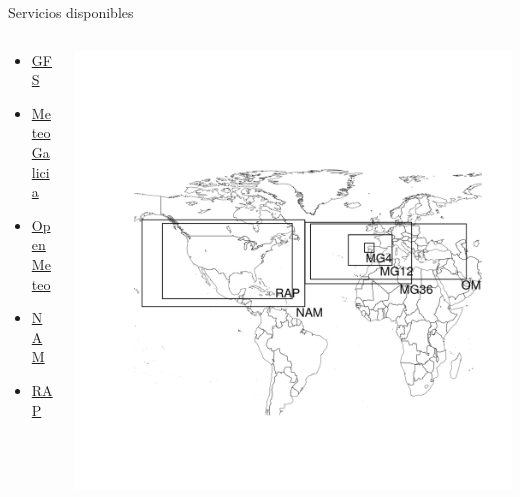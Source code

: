\documentclass[xcolor={usenames,svgnames,dvipsnames}]{beamer}
\begin{document}
\begin{frame}[label=sec-1-2]{Servicios disponibles}
\begin{columns}
\begin{column}{0.3\textwidth}

\begin{itemize}
\item \href{http://www.emc.ncep.noaa.gov/index.php?branch=GFS}{GFS}
\item \href{http://www.meteogalicia.es/web/modelos/threddsIndex.action}{MeteoGalicia}
\item \href{https://openmeteoforecast.org/}{OpenMeteo}
\item \href{http://www.ncdc.noaa.gov/data-access/model-data/model-datasets/north-american-mesoscale-forecast-system-nam}{NAM}
\item \href{http://www.ncdc.noaa.gov/data-access/model-data/model-datasets/rapid-refresh-rap}{RAP}
\end{itemize}
\end{column}
\begin{column}{0.7\textwidth}
\includegraphics[width=.9\linewidth]{figs/mapaServices.png}
\end{column}
\end{columns}
\end{frame}
\end{document}
